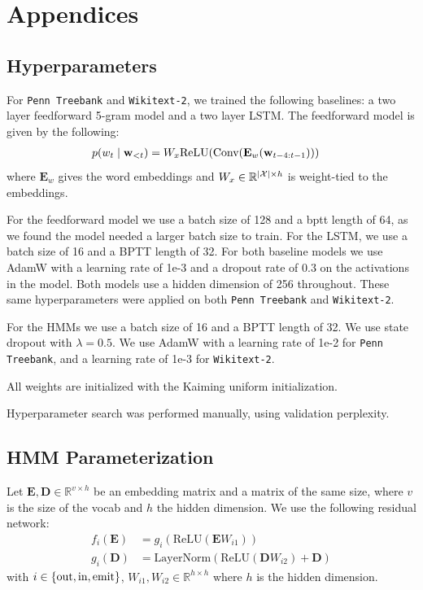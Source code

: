 \documentclass[11pt,a4paper]{article}
\begin{document}



\clearpage
\appendix

\section{Appendices}
\subsection{Hyperparameters}
\label{sec:hyperparams}

For \texttt{Penn Treebank} and \texttt{Wikitext-2}, we trained the following baselines:
a two layer feedforward 5-gram model and a two layer LSTM.
The feedforward model is given by the following:
\begin{equation}
\begin{aligned}
p(w_t \mid \mathbf{w}_{<t})
&= W_x\textrm{ReLU}(\textrm{Conv}(\mathbf{E}_w(\mathbf{w}_{t-4:t-1})))
\end{aligned}
\end{equation}
where $\mathbf{E}_w$ gives the word embeddings and
$W_x\in\mathbb{R}^{|\mathcal{X}|\times h}$ is weight-tied to the embeddings.

For the feedforward model we use a batch size of 128 and a bptt length of 64, as we found the model needed a larger batch size to train.
For the LSTM, we use a batch size of 16 and a BPTT length of 32.
For both baseline models we use AdamW \citep{adamw} with a learning rate of 1e-3 and a dropout rate of 0.3 on the activations in the model.
Both models use a hidden dimension of 256 throughout.
These same hyperparameters were applied on both \texttt{Penn Treebank} and \texttt{Wikitext-2}.

For the HMMs we use a batch size of 16 and a BPTT length of 32.
We use state dropout with $\lambda = 0.5$.
We use AdamW \citep{adamw} with a learning rate of 1e-2 for \texttt{Penn Treebank},
and a learning rate of 1e-3 for \texttt{Wikitext-2}.

All weights are initialized with the Kaiming uniform initialization.

Hyperparameter search was performed manually, using validation perplexity.

\subsection{HMM Parameterization}
Let $\mathbf{E},\mathbf{D}\in\mathbb{R}^{v \times h}$ be an
embedding matrix and a matrix of the same size,
where $v$ is the size of the vocab and $h$ the hidden dimension.
We use the following residual network:
\begin{equation}
\label{eqn:res}
\begin{aligned}
f_i(\mathbf{E}) &= g_i(\textrm{ReLU}(\mathbf{E}W_{i1}))\\
g_i(\mathbf{D}) &= \textrm{LayerNorm}(\textrm{ReLU}(\mathbf{D}W_{i2}) + \mathbf{D})
\end{aligned}
\end{equation}
with $i \in \left\{\textrm{out},\textrm{in},\textrm{emit}\right\}$,
$W_{i1},W_{i2} \in \mathbb{R}^{h \times h}$
where $h$ is the hidden dimension.
\end{document}
